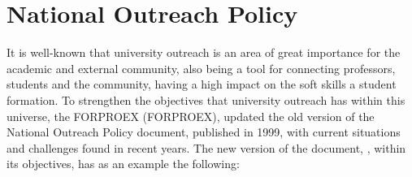 \section{National Outreach Policy}\label{sec:3.1}

It is well-known that university outreach is an area of great importance for the academic and external community, also being a tool for connecting professors, students and the community, having a high impact on the soft skills a student formation. 
To strengthen the objectives that university outreach has within this universe, the \acl{FORPROEX} (\ac{FORPROEX}), updated the old version of the National Outreach Policy document, published in 1999, with current situations and challenges found in recent years.
The new version of the document, \cite{politicaNacional}, within its objectives, has as an example the following:



